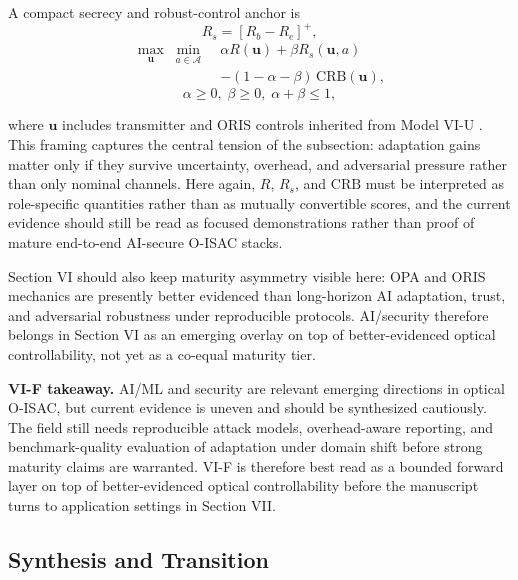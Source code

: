 \documentclass[letterpaper,journal]{IEEEtran}
\begin{document}
A compact secrecy and robust-control anchor is
\begin{equation}
    R_s=[R_b-R_e]^+,
\end{equation}
\begin{equation}
    \begin{split}
        \max_{\mathbf{u}}\;\min_{a\in\mathcal A}\; & \alpha R(\mathbf{u})+\beta R_s(\mathbf{u},a) \\
                                                   & -(1-\alpha-\beta)\,\mathrm{CRB}(\mathbf{u}),
    \end{split}
\end{equation}
\begin{equation}
    \alpha\ge 0,\;\beta\ge 0,\;\alpha+\beta\le 1,
\end{equation}

where $\mathbf{u}$ includes transmitter and ORIS controls inherited from Model VI-U \cite{O_ISAC_127,O_ISAC_145,O_ISAC_163}. This framing captures the central tension of the subsection: adaptation gains matter only if they survive uncertainty, overhead, and adversarial pressure rather than only nominal channels. Here again, $R$, $R_s$, and $\mathrm{CRB}$ must be interpreted as role-specific quantities rather than as mutually convertible scores, and the current evidence should still be read as focused demonstrations rather than proof of mature end-to-end AI-secure O-ISAC stacks.

Section VI should also keep maturity asymmetry visible here: OPA and ORIS mechanics are presently better evidenced than long-horizon AI adaptation, trust, and adversarial robustness under reproducible protocols. AI/security therefore belongs in Section VI as an emerging overlay on top of better-evidenced optical controllability, not yet as a co-equal maturity tier.

\textbf{VI-F takeaway.} AI/ML and security are relevant emerging directions in optical O-ISAC, but current evidence is uneven and should be synthesized cautiously. The field still needs reproducible attack models, overhead-aware reporting, and benchmark-quality evaluation of adaptation under domain shift before strong maturity claims are warranted. VI-F is therefore best read as a bounded forward layer on top of better-evidenced optical controllability before the manuscript turns to application settings in Section VII.

\subsection{Synthesis and Transition}
\end{document}
